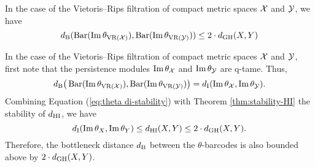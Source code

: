 \subsubsection{}
\corollary
In the case of the Vietoris--Rips filtration of compact metric spaces $\cX$ and $\cY$, we have
\[
\db(\thetabarc{\cX}, \thetabarc{\cY}) \leq 2 \cdot \dgh(X,Y)
\]


In the case of the Vietoris--Rips filtration of compact metric spaces $\cX$ and $\cY$, first note that the persistence modules $\thetamodule{\cX}$ and $\thetamodule{\cY}$ are q-tame.
Thus,
\[
\db\big(\thetabarc{\cX}, \thetabarc{\cY}\big) =
\di(\thetamodule{\cX}, \thetamodule{\cY}).
\]
Combining Equation (\ref{eq:theta di-stability}) with Theorem \ref{thm:stability-HI} the stability of $\dhi$, we have
\[
\di(\thetamodule{X}, \thetamodule{Y}) \leq
\dhi(X,Y)\leq 2\cdot \dgh(X,Y).
\]
Therefore, the bottleneck distance $\db$ between the $\theta$-barcodes is also bounded above by $2\cdot \dgh(X,Y)$.

